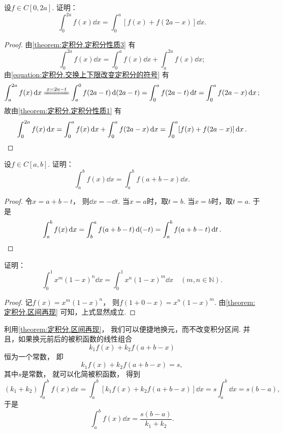 \begin{example}
设\(f \in C[0,2a]\).
证明：\begin{equation}
	\int_0^{2a} f(x) \dd{x} = \int_0^a [f(x) + f(2a-x)] \dd{x}.
\end{equation}
\begin{proof}
由\cref{theorem:定积分.定积分性质3} 有\[
	\int_0^{2a} f(x) \dd{x}
	= \int_0^a f(x) \dd{x} + \int_a^{2a} f(x) \dd{x};
\]
由\cref{equation:定积分.交换上下限改变定积分的符号} 有\[
	\int_a^{2a} f(x) \dd{x}
	\xlongequal{x=2a-t} \int_a^0 f(2a-t) \dd(2a-t)
	= \int_0^a f(2a-t) \dd{t}
	= \int_0^a f(2a-x) \dd{x};
\]
故由\cref{theorem:定积分.定积分性质1} 有\[
	\int_0^{2a} f(x) \dd{x}
	= \int_0^a f(x) \dd{x} + \int_0^a f(2a-x) \dd{x}
	= \int_0^a [f(x) + f(2a-x)] \dd{x}.
	\qedhere
\]
\end{proof}
\end{example}

\begin{proposition}\label{theorem:定积分.区间再现}
设\(f \in C[a,b]\).
证明：\begin{equation}
	\int_a^b f(x) \dd{x}
	= \int_a^b f(a+b-x) \dd{x}.
\end{equation}
\begin{proof}
令\(x=a+b-t\)，
则\(\dd{x} = -\dd{t}\).
当\(x=a\)时，取\(t=b\).
当\(x=b\)时，取\(t=a\).
于是\[
	\int_a^b f(x) \dd{x}
	= \int_b^a f(a+b-t) \dd(-t)
	= \int_a^b f(a+b-t) \dd{t}.
	\qedhere
\]
\end{proof}
\end{proposition}

\begin{example}
证明：\begin{equation}
	\int_0^1 x^m (1-x)^n \dd{x}
	= \int_0^1 x^n (1-x)^m \dd{x}
	\quad(m,n\in\mathbb{N}).
\end{equation}
\begin{proof}
记\(f(x) = x^m (1-x)^n\)，
则\(f(1+0-x) = x^n (1-x)^m\).
由\cref{theorem:定积分.区间再现} 可知，上式显然成立.
\end{proof}
\end{example}

\begin{remark}
利用\cref{theorem:定积分.区间再现}，
我们可以便捷地换元，而不改变积分区间.
并且，如果换元前后的被积函数的线性组合\[
	k_1 f(x) + k_2 f(a+b-x)
\]恒为一个常数，
即\[
	k_1 f(x) + k_2 f(a+b-x) = s,
\]
其中\(s\)是常数，
就可以化简被积函数，
得到\[
	(k_1 + k_2) \int_a^b f(x) \dd{x}
	= \int_a^b [k_1 f(x) + k_2 f(a+b-x)] \dd{x}
	= s \int_a^b \dd{x} = s(b-a),
\]
于是\[
	\int_a^b f(x) \dd{x}
	= \frac{s(b-a)}{k_1 + k_2}.
\]
\end{remark}

